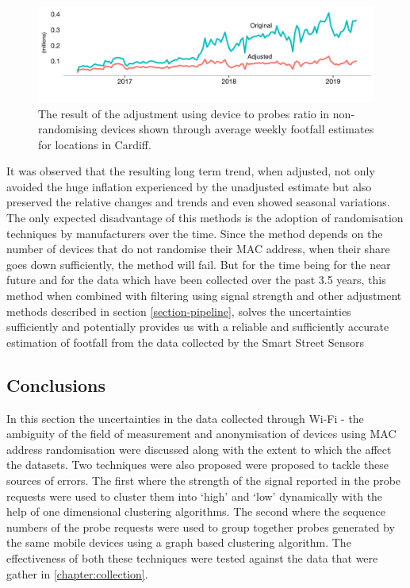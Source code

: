 \begin{figure}
  \includegraphics{images/processing-sss-final.png}
  \caption{The result of the adjustment using device to probes ratio in non-randomising devices shown through average weekly footfall estimates for locations in Cardiff.}
  \label{figure:processing:sss:final}
\end{figure}

It was observed that the resulting long term trend, when adjusted, not only avoided the huge inflation experienced by the unadjusted estimate but also preserved the relative changes and trends and even showed seasonal variations.
The only expected disadvantage of this methods is the adoption of randomisation techniques by manufacturers over the time.
Since the method depends on the number of devices that do not randomise their MAC address, when their share goes down sufficiently, the method will fail.
But for the time being for the near future and for the data which have been collected over the past 3.5 years, this method when combined with filtering using signal strength and other adjustment methods described in section \ref{section-pipeline}, solves the uncertainties sufficiently and potentially provides us with a reliable and sufficiently accurate estimation of footfall from the data collected by the Smart Street Sensors

\subsection{Conclusions}
In this section the uncertainties in the data collected through Wi-Fi - the ambiguity of the field of measurement and anonymisation of devices using MAC address randomisation were discussed along with the extent to which the affect the datasets.
Two techniques were also proposed were proposed to tackle these sources of errors.
The first where the strength of the signal reported in the probe requests were used to cluster them into `high' and `low' dynamically with the help of one dimensional clustering algorithms. 
The second where the sequence numbers of the probe requests were used to group together probes generated by the same mobile devices using a graph based clustering algorithm.
The effectiveness of both these techniques were tested against the data that were gather in \ref{chapter:collection}.

